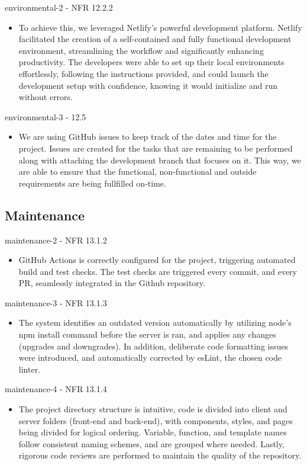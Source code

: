 \documentclass[12pt, titlepage]{article}
\begin{document}
\newpage

environmental-2 - NFR 12.2.2
\begin{itemize}
    \item To achieve this, we leveraged Netlify's powerful development platform. Netlify facilitated the creation of a self-contained and fully functional development environment, streamlining the workflow and significantly enhancing productivity. The developers were able to set up their local environments effortlessly, following the instructions provided, and could launch the development setup with confidence, knowing it would initialize and run without errors.
\end{itemize}

environmental-3 - 12.5
\begin{itemize}
    \item We are using GitHub issues to keep track of the dates and time for the project. Issues are created for the tasks that are remaining to be performed along with attaching the development branch that focuses on it. This way, we are able to ensure that the functional, non-functional and outside requirements are being fullfilled on-time.
\end{itemize}
\subsection{Maintenance}



maintenance-2 - NFR 13.1.2
\begin{itemize}
\item GitHub Actions is correctly configured for the project, triggering automated build and test checks. The test checks are triggered every commit, and every PR, seamlessly integrated in the Github repository.
\end{itemize}

maintenance-3 - NFR 13.1.3
\begin{itemize}
\item The system identifies an outdated version automatically by utilizing node’s npm install command before the server is ran, and applies any changes (upgrades and downgrades). In addition, deliberate code formatting issues were introduced, and automatically corrected by esLint, the chosen code linter.
\end{itemize}

maintenance-4 - NFR 13.1.4
\begin{itemize}
\item The project directory structure is intuitive, code is divided into client and server folders (front-end and back-end), with components, styles, and pages being divided for logical ordering. Variable, function, and template names follow consistent naming schemes, and are grouped where needed. Lastly, rigorous code reviews are performed to maintain the quality of the repository.
\end{itemize}
\end{document}
